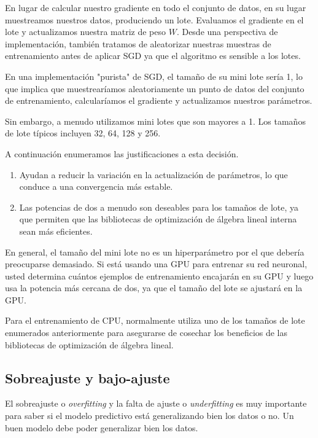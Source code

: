 \documentclass[a4paper,12pt]{article}
\begin{document}
En lugar de calcular nuestro gradiente en todo el conjunto de datos, en su lugar muestreamos nuestros datos, produciendo un lote. Evaluamos el gradiente en el lote y actualizamos nuestra matriz de peso $W$. Desde una perspectiva de implementación, también tratamos de aleatorizar nuestras muestras de entrenamiento antes de aplicar SGD ya que el algoritmo es sensible a los lotes.

En una implementación "purista" de SGD, el tamaño de su mini lote sería 1, lo que implica que muestrearíamos aleatoriamente un punto de datos del conjunto de entrenamiento, calcularíamos el gradiente
y actualizamos nuestros parámetros.

Sin embargo, a menudo utilizamos mini lotes que son mayores a 1. Los tamaños de lote típicos incluyen 32, 64, 128 y 256.

A continuación enumeramos las justificaciones a esta decisión.

\begin{enumerate}[noitemsep, topsep=2pt]
	\item Ayudan a reducir la variación en la actualización de parámetros, lo que conduce a una convergencia más estable. 
	\item Las potencias de dos a menudo son deseables para los tamaños de lote, ya que permiten que las bibliotecas de optimización de álgebra lineal interna sean más eficientes.
\end{enumerate}

En general, el tamaño del mini lote no es un hiperparámetro por el que debería preocuparse demasiado. Si está usando una GPU para entrenar su red neuronal, usted determina cuántos ejemplos de entrenamiento encajarán en su GPU y luego usa la potencia más cercana de dos, ya que el tamaño del lote se ajustará en la GPU. 

Para el entrenamiento de CPU, normalmente utiliza uno de los tamaños de lote enumerados anteriormente para asegurarse de cosechar los beneficios de las bibliotecas de optimización de álgebra lineal.

\subsection{Sobreajuste y bajo-ajuste}
El sobreajuste o \textit{overfitting} y la falta de ajuste o \textit{underfitting} \cite{quora} es muy importante para saber si el modelo predictivo está generalizando bien los datos o no. Un buen modelo debe poder generalizar bien los datos.
\end{document}
